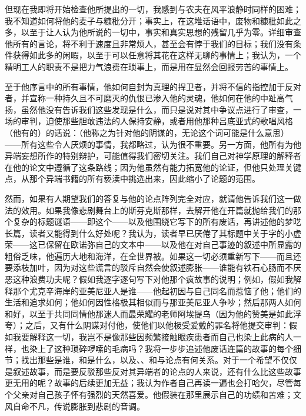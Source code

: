 但现在我即将开始检查他所提出的一切，我感到与农夫在风平浪静时同样的困难；我不知道如何将他的麦子与糠秕分开；事实上，在这堆话语中，废物和糠秕如此之多，以至于让人认为他所说的一切中，事实和真实思想的残留几乎为零。详细审查他所有的言论，将不利于速度且非常烦人，甚至会有悖于我们的目标；我们没有条件获得如此多的闲暇，以至于可以任意将其花在这样无聊的事情上；我认为，一个精明工人的职责不是把力气浪费在琐事上，而是用在显然会回报劳苦的事情上。\par

至于他序言中的所有事情，他如何自封为真理的捍卫者，并将不信的指控加于反对者，并宣称一种持久且不可磨灭的仇恨已渗入他的灵魂，他如何在他的中趾高气扬，虽然他没有告诉我们这些发现是什么，而只是说对其中争议点进行了审查，一场的审判，迫使那些胆敢违法的人保持安静，或者用他那种吕底亚式的歌唱风格（他有的）的话说：（他称之为针对他的阴谋的，无论这个词可能是什么意思）——所有这些令人厌烦的事情，我都略过，认为很不重要。另一方面，他所有为他异端妄想所作的特别辩护，可能值得我们密切关注。我们自己对神学原理的解释者在他的论文中遵循了这条路线；因为他虽然有能力拓宽他的论证，但他只处理关键点，从那个异端书籍的所有亵渎中挑选出来，因此缩小了论题的范围。\par

然而，如果有人期望我们的答复与他的论点阵列完全对应，就请他告诉我们这一做法的效用。如果我像悲剧舞台上的斯芬克斯那样，去解开他在开篇就抛给我们的那个复杂的标题谜语——即这个——以及他围绕它写下的所有废话，再讲述他的梦呓长篇，读者又能得到什么好处呢？我认为，读者早已厌倦了其标题中关于字的小虚荣——这已保留在欧诺弥自己的文本中——以及他在对自己事迹的叙述中所显露的粗俗乏味，他遍历大地和海洋，在全世界被。如果这一切必须重新写下——而且还要添枝加叶，因为对这些谎言的驳斥自然会使叙述膨胀——谁能有铁石心肠而不厌恶这种浪费功夫呢？假如我逐字逐句写下对他那个疯故事的说明；例如，假如我解释那个尤克辛海岸的亚美尼亚人是谁——他起初因与自己同名而惹恼了他；他们的生活和追求如何；他如何因性格极其相似而与那亚美尼亚人争吵；然后那两人如何和好，以至于共同同情他那迷人而最荣耀的老师阿埃提乌（因为他的赞美是如此浮夸）；之后，又有什么阴谋对付他，使他们以他极受爱戴的罪名将他提交审判：假如我要解释这一切，我岂不是像那些因频繁接触眼疾患者而自己也染上此病的人一样，也染上了这种琐碎啰嗦的毛病吗？我将一步步追述他废话连篇的故事的每个细节；找出那些是谁，和是什么，以及、、和与论点有何关系。对于一个希望不仅仅是叙述故事，而是要反驳那些反对其异端者的论点的人来说，还有什么比这些故事更无用的呢？故事的后续更加无益；我认为作者自己再读一遍也会打哈欠，尽管每个父亲对自己孩子怀有强烈的天然喜爱。他假装在那里展示自己的功绩和苦难；文风自命不凡，传说膨胀到悲剧的音调。\par

